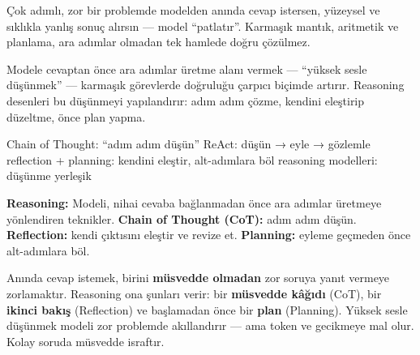 

Çok adımlı, zor bir problemde modelden anında cevap istersen, yüzeysel ve sıklıkla
yanlış sonuç alırsın --- model ``patlatır''. Karmaşık mantık, aritmetik ve planlama,
ara adımlar olmadan tek hamlede doğru çözülmez.


Modele cevaptan önce ara adımlar üretme alanı vermek --- ``yüksek sesle düşünmek'' ---
karmaşık görevlerde doğruluğu çarpıcı biçimde artırır. Reasoning desenleri bu
düşünmeyi yapılandırır: adım adım çözme, kendini eleştirip düzeltme, önce plan yapma.

\begin{timeline}
 Chain of Thought: ``adım adım düşün'' \tlsep {} ReAct: düşün → eyle → gözlemle \tlsep {} reflection + planning: kendini eleştir, alt-adımlara böl \tlsep {} reasoning modelleri: düşünme yerleşik
\end{timeline}

\begin{problembox}
\textbf{Reasoning:} Modeli, nihai cevaba bağlanmadan önce ara adımlar üretmeye
yönlendiren teknikler. \textbf{Chain of Thought (CoT):} adım adım düşün.
\textbf{Reflection:} kendi çıktısını eleştir ve revize et. \textbf{Planning:}
eyleme geçmeden önce alt-adımlara böl.
\end{problembox}

\begin{mentalbox}
Anında cevap istemek, birini \textbf{müsvedde olmadan} zor soruya yanıt vermeye
zorlamaktır. Reasoning ona şunları verir: bir \textbf{müsvedde kâğıdı} (CoT),
bir \textbf{ikinci bakış} (Reflection) ve başlamadan önce bir \textbf{plan}
(Planning). Yüksek sesle düşünmek modeli zor problemde akıllandırır --- ama
token ve gecikmeye mal olur. Kolay soruda müsvedde israftır.
\end{mentalbox}

